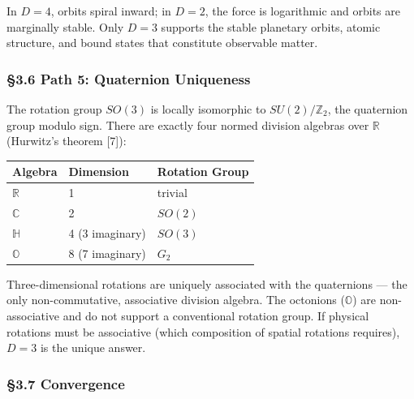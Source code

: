 \documentclass[
  11pt,
  a4paper]{article}
\begin{document}
In \(D = 4\), orbits spiral inward; in \(D = 2\), the force is
logarithmic and orbits are marginally stable. Only \(D = 3\) supports
the stable planetary orbits, atomic structure, and bound states that
constitute observable matter.

\subsubsection{§3.6 Path 5: Quaternion
Uniqueness}\label{path-5-quaternion-uniqueness}

The rotation group \(SO(3)\) is locally isomorphic to
\(SU(2)/\mathbb{Z}_2\), the quaternion group modulo sign. There are
exactly four normed division algebras over \(\mathbb{R}\) (Hurwitz's
theorem {[}7{]}):

\begin{longtable}[]{@{}lll@{}}
\toprule\noalign{}
Algebra & Dimension & Rotation Group \\
\midrule\noalign{}
\endhead
\bottomrule\noalign{}
\endlastfoot
\(\mathbb{R}\) & 1 & trivial \\
\(\mathbb{C}\) & 2 & \(SO(2)\) \\
\(\mathbb{H}\) & 4 (3 imaginary) & \(SO(3)\) \\
\(\mathbb{O}\) & 8 (7 imaginary) & \(G_2\) \\
\end{longtable}

Three-dimensional rotations are uniquely associated with the quaternions
--- the only non-commutative, associative division algebra. The
octonions (\(\mathbb{O}\)) are non-associative and do not support a
conventional rotation group. If physical rotations must be associative
(which composition of spatial rotations requires), \(D = 3\) is the
unique answer.

\subsubsection{§3.7 Convergence}\label{convergence}
\end{document}
